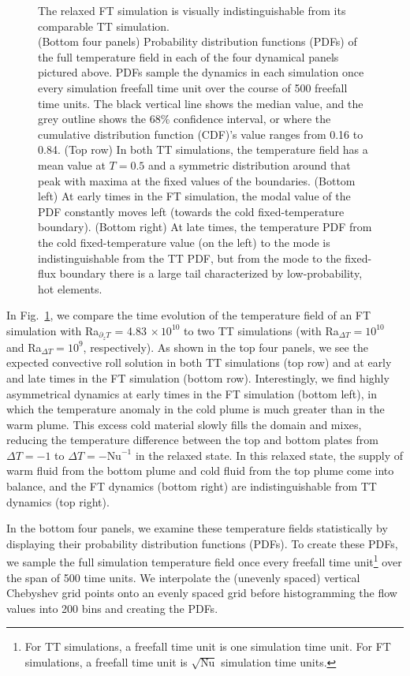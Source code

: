 \documentclass[aps, pre, onecolumn, nofootinbib, notitlepage, groupedaddress, amsfonts, amssymb, amsmath, longbibliography, superscriptaddress]{revtex4-1}
\newcommand{\ea}[1]{{\color{red} #1}}
\begin{document}
\begin{figure}[p!]
{	The relaxed FT simulation is visually indistinguishable from its comparable TT simulation.
\\	
	(Bottom four panels) Probability distribution functions (PDFs) of the full temperature field in each of the four dynamical panels pictured above.
	PDFs sample the dynamics in each simulation once every simulation freefall time unit over the course of 500 freefall time units.
	The black vertical line shows the median value, and the grey outline shows the 68\% confidence interval, or where the cumulative distribution function (CDF)'s value ranges from 0.16 to 0.84.
	(Top row) In both TT simulations, the temperature field has a mean value at $T = 0.5$ and a symmetric distribution around that peak with maxima at the fixed values of the boundaries. 
	(Bottom left) At early times in the FT simulation, the modal value of the PDF constantly moves left (towards the cold fixed-temperature boundary).
	(Bottom right) At late times, the temperature PDF from the cold fixed-temperature value (on the left) to the mode is indistinguishable from the TT PDF, but from the mode to the fixed-flux boundary there is a large tail characterized by low-probability, hot elements.
	\label{fig:rbc_evolution_dynamics} }
\end{figure}

In Fig.~\ref{fig:rbc_evolution_dynamics}, we compare the time evolution of the temperature field of an FT simulation with Ra$_{\partial_z T}$ = 4.83$\,\times 10^{10}$ to two TT simulations (with Ra$_{\Delta T} = 10^{10}$ and Ra$_{\Delta T} = 10^9$, respectively).
As shown in the top four panels, we see the expected convective roll solution in both TT simulations (top row) and at early and late times in the FT simulation (bottom row).
Interestingly, we find highly asymmetrical dynamics at early times in the FT simulation (bottom left), in which the temperature anomaly in the cold plume is much greater than in the warm plume.
This excess cold material slowly fills the domain and mixes, reducing the temperature difference between the top and bottom plates from $\Delta T = -1$ to $\Delta T = -\text{Nu}^{-1}$ in the relaxed state.
In this relaxed state, the supply of warm fluid from the bottom plume and cold fluid from the top plume come into balance, and the FT dynamics (bottom right) are indistinguishable from TT dynamics (top right).

In the bottom four panels, we examine these temperature fields statistically by displaying their probability distribution functions (PDFs).
To create these PDFs, we sample the full simulation temperature field once every freefall time unit\footnote{\ea{For TT simulations, a freefall time unit is one simulation time unit. For FT simulations, a freefall time unit is $\sqrt{\text{Nu}}$ simulation time units.}} over the span of 500 time units.
We interpolate the (unevenly spaced) vertical Chebyshev grid points onto an evenly spaced grid before histogramming the flow values into 200 bins and creating the PDFs.
\end{document}

